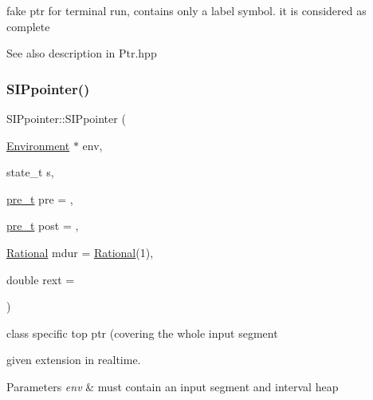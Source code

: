 fake ptr for terminal run, contains only a label symbol. it is considered as complete 

\begin{DoxySeeAlso}{See also}
description in Ptr.\+hpp 
\end{DoxySeeAlso}
\mbox{\label{group__table_ga5470d875405a71931e2349915201da20}} 
\subsubsection{\texorpdfstring{SIPpointer()}{SIPpointer()}\hspace{0.1cm}{\footnotesize\ttfamily [3/7]}}
{\footnotesize\ttfamily S\+I\+Ppointer\+::\+S\+I\+Ppointer (\begin{DoxyParamCaption}\item[{\mbox{\hyperlink{classEnvironment}{Environment}} $\ast$}]{env,  }\item[{state\+\_\+t}]{s,  }\item[{\mbox{\hyperlink{group__general_ga092fe8b972dfa977c2a0886720a7731e}{pre\+\_\+t}}}]{pre = {},  }\item[{\mbox{\hyperlink{group__general_ga092fe8b972dfa977c2a0886720a7731e}{pre\+\_\+t}}}]{post = {},  }\item[{\mbox{\hyperlink{classRational}{Rational}}}]{mdur = {\ttfamily \mbox{\hyperlink{classRational}{Rational}}(1)},  }\item[{double}]{rext = {} }\end{DoxyParamCaption})}



class specific top ptr (covering the whole input segment 


\begin{DoxyItemize}
\item given extension in realtime.
\end{DoxyItemize}


\begin{DoxyParams}{Parameters}
{\em env} & must contain an input segment and interval heap \\
\hline
\end{DoxyParams}
\mbox{\label{group__table_gaeea3246bf0f27b8b4a0a930f7d1a4379}} 
